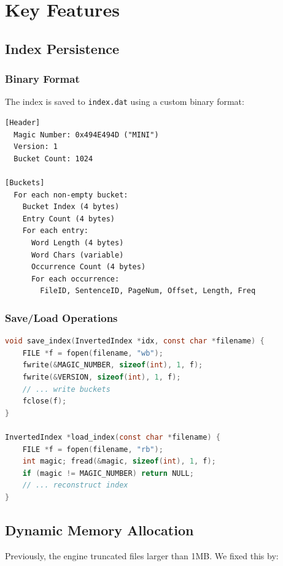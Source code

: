 \documentclass[12pt,a4paper]{article}
\begin{document}
\newpage
\section{Key Features}

\subsection{Index Persistence}

\subsubsection{Binary Format}
The index is saved to \texttt{index.dat} using a custom binary format:

\begin{verbatim}
[Header]
  Magic Number: 0x494E494D ("MINI")
  Version: 1
  Bucket Count: 1024

[Buckets]
  For each non-empty bucket:
    Bucket Index (4 bytes)
    Entry Count (4 bytes)
    For each entry:
      Word Length (4 bytes)
      Word Chars (variable)
      Occurrence Count (4 bytes)
      For each occurrence:
        FileID, SentenceID, PageNum, Offset, Length, Freq
\end{verbatim}

\subsubsection{Save/Load Operations}
\begin{lstlisting}[language=C]
void save_index(InvertedIndex *idx, const char *filename) {
    FILE *f = fopen(filename, "wb");
    fwrite(&MAGIC_NUMBER, sizeof(int), 1, f);
    fwrite(&VERSION, sizeof(int), 1, f);
    // ... write buckets
    fclose(f);
}

InvertedIndex *load_index(const char *filename) {
    FILE *f = fopen(filename, "rb");
    int magic; fread(&magic, sizeof(int), 1, f);
    if (magic != MAGIC_NUMBER) return NULL;
    // ... reconstruct index
}
\end{lstlisting}

\subsection{Dynamic Memory Allocation}

Previously, the engine truncated files larger than 1MB. We fixed this by:
\end{document}
